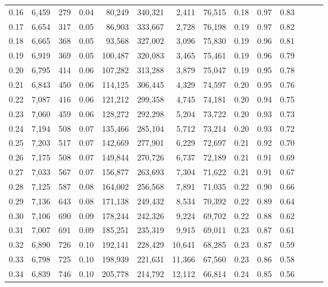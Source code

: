 \begin{tabular}{rrrrrrrrrrrrrr}
0.16 &  6,459 &    279 &  0.04 &   80,249 &  340,321 &   2,411 &  76,515 &  0.18 &  0.97 &      0.83 \\
0.17 &  6,654 &    317 &  0.05 &   86,903 &  333,667 &   2,728 &  76,198 &  0.19 &  0.97 &      0.82 \\
0.18 &  6,665 &    368 &  0.05 &   93,568 &  327,002 &   3,096 &  75,830 &  0.19 &  0.96 &      0.81 \\
0.19 &  6,919 &    369 &  0.05 &  100,487 &  320,083 &   3,465 &  75,461 &  0.19 &  0.96 &      0.79 \\
0.20 &  6,795 &    414 &  0.06 &  107,282 &  313,288 &   3,879 &  75,047 &  0.19 &  0.95 &      0.78 \\
0.21 &  6,843 &    450 &  0.06 &  114,125 &  306,445 &   4,329 &  74,597 &  0.20 &  0.95 &      0.76 \\
0.22 &  7,087 &    416 &  0.06 &  121,212 &  299,358 &   4,745 &  74,181 &  0.20 &  0.94 &      0.75 \\
0.23 &  7,060 &    459 &  0.06 &  128,272 &  292,298 &   5,204 &  73,722 &  0.20 &  0.93 &      0.73 \\
0.24 &  7,194 &    508 &  0.07 &  135,466 &  285,104 &   5,712 &  73,214 &  0.20 &  0.93 &      0.72 \\
0.25 &  7,203 &    517 &  0.07 &  142,669 &  277,901 &   6,229 &  72,697 &  0.21 &  0.92 &      0.70 \\
0.26 &  7,175 &    508 &  0.07 &  149,844 &  270,726 &   6,737 &  72,189 &  0.21 &  0.91 &      0.69 \\
0.27 &  7,033 &    567 &  0.07 &  156,877 &  263,693 &   7,304 &  71,622 &  0.21 &  0.91 &      0.67 \\
0.28 &  7,125 &    587 &  0.08 &  164,002 &  256,568 &   7,891 &  71,035 &  0.22 &  0.90 &      0.66 \\
0.29 &  7,136 &    643 &  0.08 &  171,138 &  249,432 &   8,534 &  70,392 &  0.22 &  0.89 &      0.64 \\
0.30 &  7,106 &    690 &  0.09 &  178,244 &  242,326 &   9,224 &  69,702 &  0.22 &  0.88 &      0.62 \\
0.31 &  7,007 &    691 &  0.09 &  185,251 &  235,319 &   9,915 &  69,011 &  0.23 &  0.87 &      0.61 \\
0.32 &  6,890 &    726 &  0.10 &  192,141 &  228,429 &  10,641 &  68,285 &  0.23 &  0.87 &      0.59 \\
0.33 &  6,798 &    725 &  0.10 &  198,939 &  221,631 &  11,366 &  67,560 &  0.23 &  0.86 &      0.58 \\
0.34 &  6,839 &    746 &  0.10 &  205,778 &  214,792 &  12,112 &  66,814 &  0.24 &  0.85 &      0.56 \\

\end{tabular}
